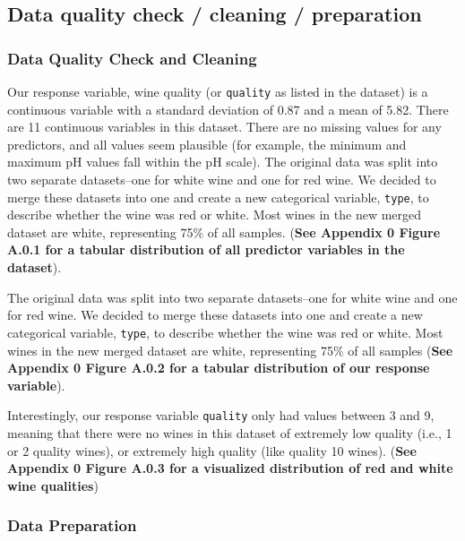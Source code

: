 \documentclass[
  letterpaper,
  DIV=11,
  numbers=noendperiod]{scrartcl}
\begin{document}
\hypertarget{data-quality-check-cleaning-preparation}{%
\subsection{Data quality check / cleaning /
preparation}\label{data-quality-check-cleaning-preparation}}

\hypertarget{data-quality-check-and-cleaning}{%
\subsubsection{Data Quality Check and
Cleaning}\label{data-quality-check-and-cleaning}}

Our response variable, wine quality (or \texttt{quality} as listed in
the dataset) is a continuous variable with a standard deviation of 0.87
and a mean of 5.82. There are 11 continuous variables in this dataset.
There are no missing values for any predictors, and all values seem
plausible (for example, the minimum and maximum pH values fall within
the pH scale). The original data was split into two separate
datasets--one for white wine and one for red wine. We decided to merge
these datasets into one and create a new categorical variable,
\texttt{type}, to describe whether the wine was red or white. Most wines
in the new merged dataset are white, representing 75\% of all samples.
(\textbf{See Appendix 0 Figure A.0.1 for a tabular distribution of all
predictor variables in the dataset}).

The original data was split into two separate datasets--one for white
wine and one for red wine. We decided to merge these datasets into one
and create a new categorical variable, \texttt{type}, to describe
whether the wine was red or white. Most wines in the new merged dataset
are white, representing 75\% of all samples (\textbf{See Appendix 0
Figure A.0.2 for a tabular distribution of our response variable}).

Interestingly, our response variable \texttt{quality} only had values
between 3 and 9, meaning that there were no wines in this dataset of
extremely low quality (i.e., 1 or 2 quality wines), or extremely high
quality (like quality 10 wines). (\textbf{See Appendix 0 Figure A.0.3
for a visualized distribution of red and white wine qualities})

\hypertarget{data-preparation}{%
\subsubsection{Data Preparation}\label{data-preparation}}
\end{document}

